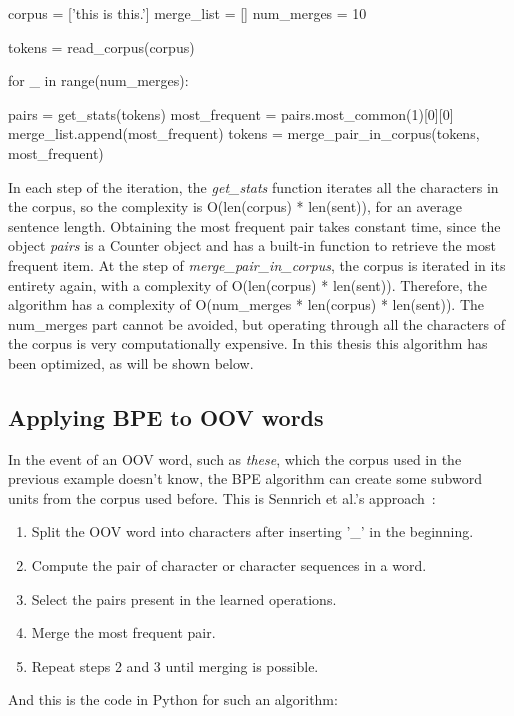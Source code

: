 \begin{python}
corpus = ['this is this.']
merge_list = []
num_merges = 10

tokens = read_corpus(corpus)

for _ in range(num_merges):

    pairs = get_stats(tokens)
    most_frequent = pairs.most_common(1)[0][0]
    merge_list.append(most_frequent)
    tokens = merge_pair_in_corpus(tokens, most_frequent)
\end{python}

In each step of the iteration, the \emph{get\_stats} function iterates all the characters in the corpus, so the complexity is O(len(corpus) * len(sent)), for an average sentence length. Obtaining the most frequent pair takes constant time, since the object \emph{pairs} is a Counter object and has a built-in function to retrieve the most frequent item. At the step of \emph{merge\_pair\_in\_corpus}, the corpus is iterated in its entirety again, with a complexity of O(len(corpus) * len(sent)). Therefore, the algorithm has a complexity of O(num\_merges * len(corpus) * len(sent)). The num\_merges part cannot be avoided, but operating through all the characters of the corpus is very computationally expensive. In this thesis this algorithm has been optimized, as will be shown below.

\subsection{Applying BPE to OOV words}

In the event of an OOV word, such as \emph{these}, which the corpus used in the previous example doesn't know, the BPE algorithm can create some subword units from the corpus used before. This is Sennrich et al.'s approach~\cite{sennrich2015neural}:

\begin{enumerate}
    \item Split the OOV word into characters after inserting '\_' in the beginning.
    \item Compute the pair of character or character sequences in a word.
    \item Select the pairs present in the learned operations.
    \item Merge the most frequent pair.
    \item Repeat steps 2 and 3 until merging is possible.
\end{enumerate}

And this is the code in Python for such an algorithm:

